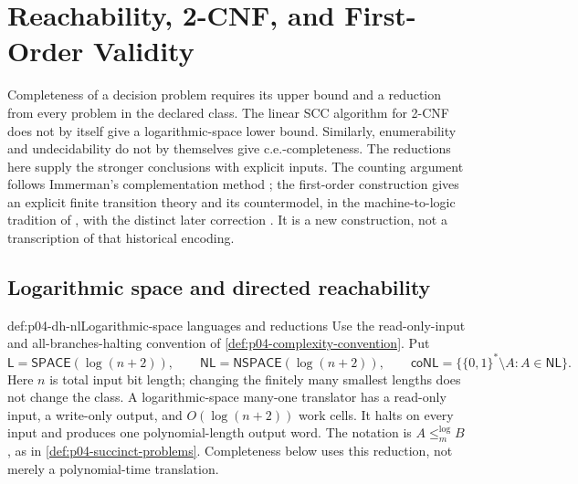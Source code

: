\chapter{Reachability, 2-CNF, and First-Order Validity}
\label{sec:p04-decision-problem-hardness}

Completeness of a decision problem requires its upper bound and a reduction
from every problem in the declared class. The linear SCC algorithm for
2-CNF does not by itself give a logarithmic-space lower bound. Similarly,
enumerability and undecidability do not by themselves give c.e.-completeness.
The reductions here supply the stronger conclusions with explicit inputs.
The counting argument follows Immerman's complementation method
\cite{Immerman1988Complement}; the first-order construction gives an explicit
finite transition theory and its countermodel, in the machine-to-logic
tradition of \cite[\S11]{Turing1937}, with the distinct later correction
\cite[pp.~544--545]{Turing1938DecisionCorrection}. It is a new construction,
not a transcription of that historical encoding.

\section{Logarithmic space and directed reachability}
\label{sec:p04-dh-reachability}

\begin{hbdefinition}{def:p04-dh-nl}{Logarithmic-space languages and reductions}
Use the read-only-input and all-branches-halting convention of
\cref{def:p04-complexity-convention}. Put
\[
 \mathsf L=\mathsf{SPACE}(\log(n+2)),\qquad
 \mathsf{NL}=\mathsf{NSPACE}(\log(n+2)),
 \qquad
 \mathsf{coNL}=\{\{0,1\}^*\setminus A:A\in\mathsf{NL}\}.
\]
Here \(n\) is total input bit length; changing the finitely many smallest
lengths does not change the class. A logarithmic-space many-one translator
has a read-only input, a write-only output, and \(O(\log(n+2))\) work cells.
It halts on every input and produces one polynomial-length output word.
The notation is \(A\leq_m^{\log}B\), as in
\cref{def:p04-succinct-problems}. Completeness below uses this reduction,
not merely a polynomial-time translation.
\end{hbdefinition}

